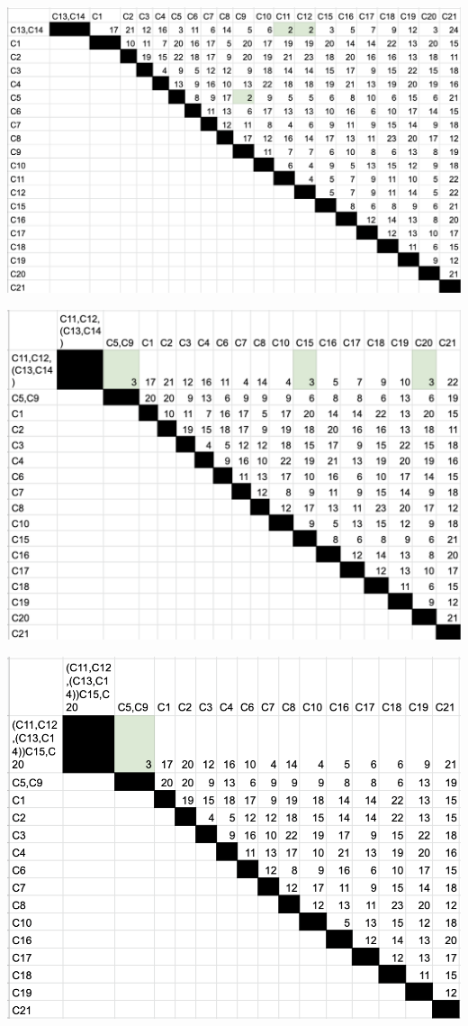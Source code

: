\documentclass[a4paper,table,xcdraw]{article}
\begin{document}
\includegraphics[scale=0.6]{./img/carac3.png}

\includegraphics[scale=0.8]{./img/carac4.png}

\includegraphics[scale=0.8]{./img/carac5.png}
\end{document}

